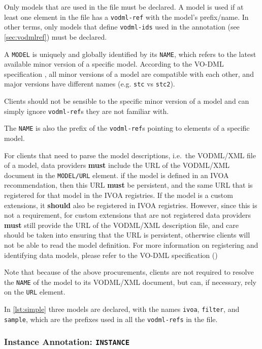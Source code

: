 \documentclass[11pt,a4paper]{ivoa}
\begin{document}
Only models that are used in the file must be declared. A model is used
if at least one element in the file has a \texttt{vodml-ref} with the
model's prefix/name. In other terms, only models that define
\texttt{vodml-ids} used in the annotation (see \ref{sec:vodmlref}) must
be declared.

A \texttt{MODEL} is uniquely and globally identified by its
\texttt{NAME}, which refers to the latest available minor version of a
specific model. According to the VO-DML specification \cite{2018ivoa.spec.0910L}, all
minor versions of a model are compatible with each other, and major
versions have different names (e.g. \texttt{stc} vs \texttt{stc2}).

Clients should not be sensible to the specific minor version of a model
and can simply ignore \texttt{vodml-ref}s they are not familiar with.

The \texttt{NAME} is also the prefix of the \texttt{vodml-ref}s pointing
to elements of a specific model.

For clients that need to parse the model descriptions, i.e.~the
VODML/XML file of a model, data providers \textbf{must} include the URL
of the VODML/XML document in the \texttt{MODEL/URL} element. if the
model is defined in an IVOA recommendation, then this URL \textbf{must}
be persistent, and the same URL that is registered for that model in the
IVOA registries. If the model is a custom extensions, it \textbf{should}
also be registered in IVOA registries. However, since this is not a
requirement, for custom extensions that are not registered data
providers \textbf{must} still provide the URL of the VODML/XML
description file, and care should be taken into ensuring that the URL is
persistent, otherwise clients will not be able to read the model
definition. For more information on registering and identifying data
models, please refer to the VO-DML specification (\cite{2018ivoa.spec.0910L})

Note that because of the above procurements, clients are not required to
resolve the \texttt{NAME} of the model to its VODML/XML document, but
can, if necessary, rely on the \texttt{URL} element.

In \ref{lst:simple} three models are declared, with the names
\texttt{ivoa}, \texttt{filter}, and \texttt{sample}, which are the
prefixes used in all the \texttt{vodml-refs} in the file.

\subsubsection{Instance Annotation: \texttt{INSTANCE}}\label{sec:norm-instance}
\end{document}
